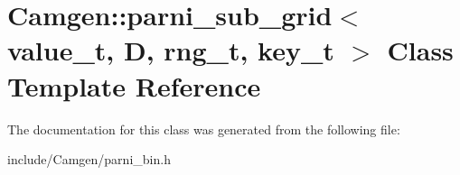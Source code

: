 \hypertarget{a00390}{\section{Camgen\-:\-:parni\-\_\-sub\-\_\-grid$<$ value\-\_\-t, D, rng\-\_\-t, key\-\_\-t $>$ Class Template Reference}
\label{a00390}
}


The documentation for this class was generated from the following file\-:\begin{DoxyCompactItemize}
\item 
include/\-Camgen/parni\-\_\-bin.\-h\end{DoxyCompactItemize}
